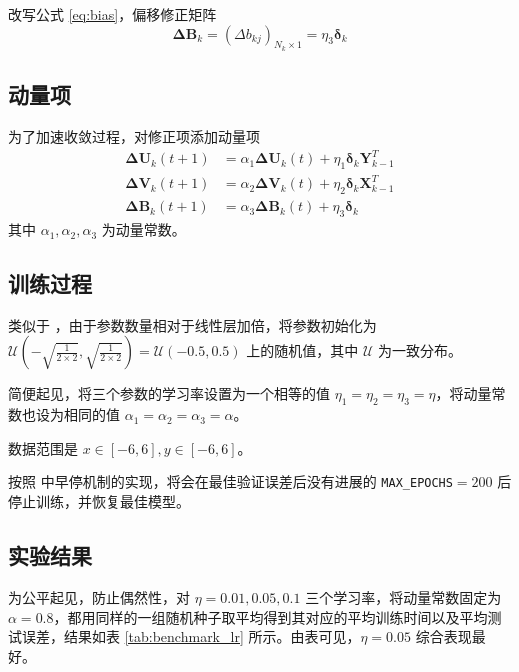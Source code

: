    改写公式 \eqref{eq:bias}，偏移修正矩阵
    \begin{equation*}
        \mathbf{\Delta B}_{k} = (\Delta b_{kj})_{N_{k}\times 1} = \eta_3 \boldsymbol{\delta}_{k}
    \end{equation*}

    \subsection{动量项}

    为了加速收敛过程，对修正项添加动量项
    \begin{align}
        \mathbf{\Delta U}_{k}(t+1) &= \alpha_1\mathbf{\Delta U}_{k}(t) + \eta_1 \boldsymbol{\delta}_k\mathbf{Y}_{k-1}^T \\
        \mathbf{\Delta V}_{k}(t+1) &= \alpha_2\mathbf{\Delta V}_{k}(t) + \eta_2 \boldsymbol{\delta}_k\mathbf{X}_{k-1}^T \\
        \mathbf{\Delta B}_{k}(t+1) &= \alpha_3\mathbf{\Delta B}_{k}(t) + \eta_3 \boldsymbol{\delta}_{k}
    \end{align}
    其中 $\alpha_1,\alpha_2,\alpha_3$ 为动量常数。

    \subsection{训练过程}

    类似于 \cite{torchlinear}，由于参数数量相对于线性层加倍，将参数初始化为 $\mathcal{U}\left(-\sqrt{\frac{1}{2\times 2}},\sqrt{\frac{1}{2\times 2}}\right)=\mathcal{U}(-0.5,0.5)$ 上的随机值，其中 $\mathcal{U}$ 为一致分布。

    简便起见，将三个参数的学习率设置为一个相等的值 $\eta_1=\eta_2=\eta_3=\eta$，将动量常数也设为相同的值 $\alpha_1=\alpha_2=\alpha_3=\alpha$。

    数据范围是 $x\in[-6,6],y\in[-6,6]$。

    按照 \cite{tfearly} 中早停机制的实现，将会在最佳验证误差后没有进展的 \texttt{MAX\_EPOCHS}$=200$ 后停止训练，并恢复最佳模型。


    \subsection{实验结果}

    为公平起见，防止偶然性，对 $\eta=0.01,0.05,0.1$ 三个学习率，将动量常数固定为 $\alpha=0.8$，都用同样的一组随机种子取平均得到其对应的平均训练时间以及平均测试误差，结果如表 \ref{tab:benchmark_lr} 所示。由表可见，$\eta=0.05$ 综合表现最好。

